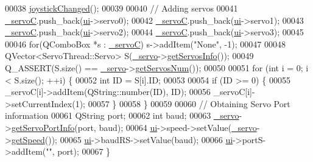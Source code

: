 \begin{DoxyCode}
00038     \hyperlink{a00006_ae8c0373be58da710194f8d14f1c3c4dc}{joystickChanged}();
00039     
00040     \textcolor{comment}{// Adding servos}
00041     \hyperlink{a00006_a45137fbf71bbee10e171019c913b88b7}{\_servoC}.push\_back(\hyperlink{a00006_a8347442d5b3b670e8fff0c4102db1f88}{ui}->servo0);
00042     \hyperlink{a00006_a45137fbf71bbee10e171019c913b88b7}{\_servoC}.push\_back(\hyperlink{a00006_a8347442d5b3b670e8fff0c4102db1f88}{ui}->servo1);
00043     \hyperlink{a00006_a45137fbf71bbee10e171019c913b88b7}{\_servoC}.push\_back(\hyperlink{a00006_a8347442d5b3b670e8fff0c4102db1f88}{ui}->servo2);
00044     \hyperlink{a00006_a45137fbf71bbee10e171019c913b88b7}{\_servoC}.push\_back(\hyperlink{a00006_a8347442d5b3b670e8fff0c4102db1f88}{ui}->servo3);
00045     
00046     \textcolor{keywordflow}{for}(QComboBox *s : \hyperlink{a00006_a45137fbf71bbee10e171019c913b88b7}{\_servoC}) s->addItem(\textcolor{stringliteral}{"None"}, -1);
00047     
00048     QVector<ServoThread::Servo> S(\hyperlink{a00006_acba1566fea3f831000d5e1c1edc3e776}{\_servo}->\hyperlink{a00009_a5fd8ef13314428f5ba7646730cc58f1c}{getServosInfo}());
00049     Q\_ASSERT(S.size() == \hyperlink{a00006_acba1566fea3f831000d5e1c1edc3e776}{\_servo}->\hyperlink{a00009_ad6ead0ac6fce4539d4b0ff5a3e18ac38}{getServosNum}());
00050      
00051     \textcolor{keywordflow}{for} (\textcolor{keywordtype}{int} i = 0; i < S.size(); ++i) \{
00052         \textcolor{keywordtype}{int} ID = S[i].ID;
00053         
00054         \textcolor{keywordflow}{if} (ID >= 0) \{
00055             \_servoC[i]->addItem(QString::number(ID), ID);
00056             \_servoC[i]->setCurrentIndex(1);
00057         \}
00058     \}
00059     
00060     \textcolor{comment}{// Obtaining Servo Port information}
00061     QString port;
00062     \textcolor{keywordtype}{int} baud;
00063     \hyperlink{a00006_acba1566fea3f831000d5e1c1edc3e776}{\_servo}->\hyperlink{a00009_afcf834d93f1ac9663d6ebaab820e5f74}{getServoPortInfo}(port, baud);
00064     \hyperlink{a00006_a8347442d5b3b670e8fff0c4102db1f88}{ui}->speed->setValue(\hyperlink{a00006_acba1566fea3f831000d5e1c1edc3e776}{\_servo}->\hyperlink{a00009_a6af364effc9c52c0acec7d00a2c3d262}{getSpeed}());
00065     \hyperlink{a00006_a8347442d5b3b670e8fff0c4102db1f88}{ui}->baudRS->setValue(baud);
00066     \hyperlink{a00006_a8347442d5b3b670e8fff0c4102db1f88}{ui}->portS->addItem(\textcolor{stringliteral}{""}, port);
00067 \}
\end{DoxyCode}
\hypertarget{a00006_a034c885fe8bb4416e732a9571d14a6b4}{}
